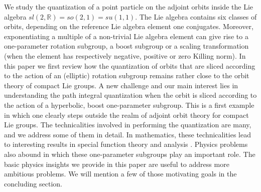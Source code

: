 \documentclass[12pt]{article}
\numberwithin{equation}{section}
\numberwithin{equation}{section}
\numberwithin{table}{section}\setlength{\multlinegap}{25pt}
\begin{document}
We study the quantization of a point particle on the adjoint orbits inside the Lie algebra $sl(2,\mathbb{R})=so(2,1)=su(1,1)$. The Lie algebra contains six classes of orbits, depending on the reference Lie algebra element one conjugates. Moreover, exponentiating a multiple of a  non-trivial Lie algebra element can give rise to a one-parameter rotation subgroup, a boost subgroup or a scaling transformation (when the element has respectively negative, positive or zero Killing norm). 
In this paper we first review how the quantization of orbits that are sliced according to the action of an (elliptic) rotation subgroup remains rather close to the orbit theory of compact Lie groups. 
A new challenge and our main interest lies in understanding the path integral quantization when the orbit is sliced according to the action of a hyperbolic, boost one-parameter subgroup. This is a first example in which one clearly steps outside the realm of adjoint orbit theory for compact Lie groups.  The technicalities involved in performing the quantization are many, and we address some of them in detail. In mathematics, these technicalities lead to interesting results in special function theory and analysis \cite{PinkBook}. Physics problems also abound in which these one-parameter subgroups play an important role. The basic physics insights we provide in this paper are useful to address more ambitious problems. We will mention a few of those motivating goals in the concluding section. 
\end{document}
